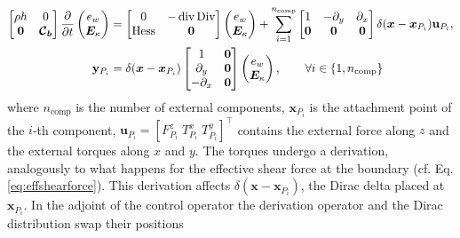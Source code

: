 \begin{equation}
\begin{aligned}
\begin{bmatrix}
\rho h & 0 \\ 
\bm{0} & \bm{\mathcal{C}_b} \\
\end{bmatrix}
\diffp{}{t}
\begin{pmatrix}
e_w \\ \bm{E}_\kappa \\
\end{pmatrix} &= 
\begin{bmatrix}
0 & -\div\Div \\ 
\Hess & \bm{0} \\
\end{bmatrix}
\begin{pmatrix}
e_w \\ \bm{E}_\kappa \\
\end{pmatrix} + 
\sum_{i = 1}^{n_{\mathrm{comp}}} 
\begin{bmatrix}
1 & -\partial_y & \partial_x \\
\bm{0} & \bm{0} & \bm{0} \\
\end{bmatrix} \delta(\bm{x} - \bm{x}_{P_i}) \mathbf{u}_{P_i}, \\
\mathbf{y}_{P_i} &= \delta(\bm{x} - \bm{x}_{P_i}) \begin{bmatrix}
1 & \bm{0} \\
\partial_y & \bm{0} \\
-\partial_x & \bm{0} \\
\end{bmatrix}  \begin{pmatrix}
e_w \\ \bm{E}_\kappa \\
\end{pmatrix}, \qquad \forall i \in \{1, n_{\mathrm{comp}}\}
\end{aligned}
\end{equation}
where $n_{\mathrm{comp}}$ is the number of external components, $\bm{x}_{P_i}$ is the attachment point of the $i$-th component, $\mathbf{u}_{P_i} = [F_{P_i}^z \; T_{P_i}^x \; T_{P_i}^y]^\top$ contains the external force along $z$ and the external torques along $x$ and $y$. The torques undergo a derivation, analogously to what happens for the effective shear force at the boundary (cf. Eq. \eqref{eq:effshearforce}). This derivation affects  $\delta(\bm{x} - \bm{x}_{P_i})$, the Dirac delta placed at $\bm{x}_{P_i}$. In the adjoint of the control operator the derivation operator and the Dirac distribution swap their positions
